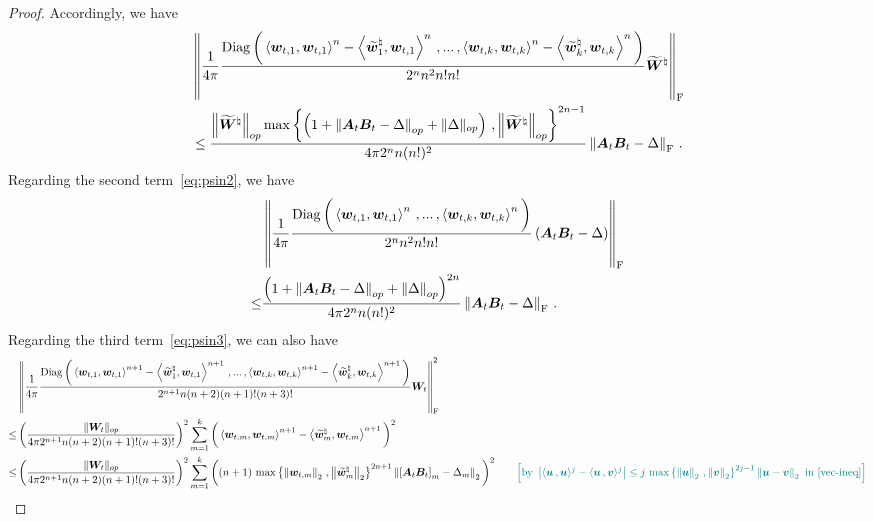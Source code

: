 \begin{proof}
Accordingly, we have
\begin{align*}
    &\left\|\frac{1}{4\pi} \frac{\operatorname{Diag}\bigg(\left\langle{\bm w}_{t,1},{\bm w}_{t,1}\right\rangle^{n}-\left\langle\widetilde{\bm w}^\natural_1,{\bm w}_{t,1}\right\rangle^{n}\,,...\,,\left\langle{\bm w}_{t,k},{\bm w}_{t,k}\right\rangle^{n}-\left\langle\widetilde{\bm w}^\natural_k,{\bm w}_{t,k}\right\rangle^{n}\bigg)}{2^{n} n^2 n! n!}  \widetilde{\bm W}^\natural\right\|_{\rm F}\\
    &\leq \frac{\left\|\widetilde{\bm W}^\natural\right\|_{op}\max\left\{\left(1 + \left\|\bm A_t \bm B_t - \Delta\right\|_{op} + \|\Delta\|_{op}\right)\,,\left\|\widetilde{\bm W}^\natural\right\|_{op}\right\}^{2n-1}}{4\pi 2^{n} n (n!)^2}\left\|\bm A_t \bm B_t - \Delta\right\|_{\rm F}\,.
\end{align*}
Regarding the second term~\eqref{eq:psin2}, we have
\begin{align*}
    &\left\|\frac{1}{4\pi} \frac{\operatorname{Diag}\bigg(\left\langle{\bm w}_{t,1},{\bm w}_{t,1}\right\rangle^n\,,...\,,\left\langle{\bm w}_{t,k},{\bm w}_{t,k}\right\rangle^n\bigg)}{2^{n} n^2 n! n!}\left(\bm A_t \bm B_t - \Delta\right)\right\|_{\rm F}\\
    \leq & \frac{\left(1+\left\|\bm A_{t}\bm B_t - \Delta\right\|_{op}+\left\|\Delta\right\|_{op}\right)^{2n}}{4\pi2^{n} n (n!)^2}\left\|\bm A_t \bm B_t - \Delta\right\|_{\rm F}\,.
\end{align*}
Regarding the third term~\eqref{eq:psin3}, we can also have
\begin{align*}
    &\left\|\frac{1}{4\pi}\frac{\operatorname{Diag}\bigg(\left\langle{\bm w}_{t,1},{\bm w}_{t,1}\right\rangle^{n+1}-\left\langle\widetilde{\bm w}^\natural_1,{\bm w}_{t,1}\right\rangle^{n+1}\,,...\,,\left\langle{\bm w}_{t,k},{\bm w}_{t,k}\right\rangle^{n+1}-\left\langle\widetilde{\bm w}^\natural_k,{\bm w}_{t,k}\right\rangle^{n+1}\bigg)}{2^{n+1} n(n + 2)(n+1)!(n+3)!}{\bm W}_{t}\right\|^2_{\rm F}\\
    \leq & \left(\frac{\|\bm W_t\|_{op}}{4\pi2^{n+1} n(n + 2)(n+1)!(n+3)!}\right)^2\sum_{m=1}^k\bigg(\left\langle{\bm w}_{t,m},{\bm w}_{t,m}\right\rangle^{n+1}-\left\langle\widetilde{\bm w}^\natural_m,{\bm w}_{t,m}\right\rangle^{n+1}\bigg)^2\\
    \leq & \left(\frac{\|\bm W_t\|_{op}}{4\pi2^{n+1} n(n + 2)(n+1)!(n+3)!}\right)^2\sum_{m=1}^k\bigg((n+1)\,\max\left\{\left\|{\bm w}_{t,m}\right\|_2\,,\left\|\widetilde{\bm w}^\natural_m\right\|_2\right\}^{2n+1}\left\|\left[\bm A_t \bm B_t\right]_{m}-\Delta_m\right\|_2\bigg)^2\tag*{\color{teal}$\left[\text{by }\left|\langle \bm u\,, \bm u \rangle^j - \langle \bm u\,, \bm v \rangle^j\right| \leq j\,\max\left\{\left\|\bm u\right\|_2\,,\left\|\bm v\right\|_2\right\}^{2j-1} \left\|\bm u - \bm v\right\|_2\text{ in \cref{vec-ineq}}\right]$}\\

\end{align*}
\end{proof}
